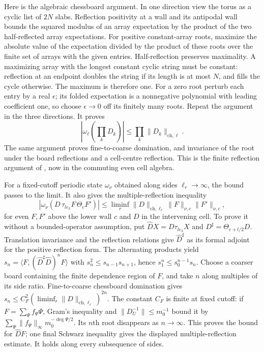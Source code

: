 \documentclass[11pt,letterpaper,reqno]{amsart}
\theoremstyle{definition}
\theoremstyle{remark}
\begin{document}
Here is the algebraic chessboard argument.  In
one direction view the torus as a cyclic list
of $2N$ slabs.  Reflection positivity at a wall
and its antipodal wall bounds the squared modulus of
an array expectation by the product of the
two half-reflected array expectations.  For
positive constant-array roots, maximize the absolute value of the
expectation divided by the product of these
roots over the finite set of arrays with the
given entries.  Half-reflection preserves
maximality.  A maximizing array with the
longest constant cyclic string must be
constant: reflection at an endpoint doubles
the string if its length is at most $N$,
and fills the cycle otherwise.  The maximum
is therefore one.  For a zero root perturb
each entry by a real $\epsilon$; its folded
expectation is a nonnegative polynomial
with leading coefficient one, so choose
$\epsilon\to0$ off its finitely many roots.
Repeat the argument in the three directions.
It proves
\[
 |\omega_\ell(\prod_kD_k)|
                 \le\prod_k\|D_k\|_{\mathrm{ch},\ell}.
\]
The same argument proves fine-to-coarse
domination, and invariance of the root under
the board reflections and a cell-centre
reflection.  This is the finite reflection
argument of \cite[Proposition 91.7]{YMM1},
now in the commuting even cell algebra.

For a fixed-cutoff periodic state $\omega_\nu$
obtained along sides $\ell_r\to\infty$, the
bound passes to the limit.  It also gives
the multiple-reflection inequality
\[
 |\omega_\nu(D\,\tau_{le_3}F\,\Theta_cF')|
 \le\liminf_r\|D\|_{\mathrm{ch},\ell_r}
                        \|F\|_{\nu,c}\|F'\|_{\nu,c},
\]
for even $F,F'$ above the lower wall $c$ and
$D$ in the intervening cell.  To prove it
without a bounded-operator assumption, put
$\widehat DX=D\tau_{le_3}X$ and
$D^\sharp=\Theta_{c+l/2}D$.
Translation invariance and the reflection
relations give $\widehat D^\sharp$ as its
formal adjoint for the positive reflection
form.  The alternating products yield
$s_n=\langle F,(\widehat D^\sharp\widehat D)^nF\rangle$
with $s_n^2\le s_{n-1}s_{n+1}$, hence
$s_1^n\le s_0^{n-1}s_n$.
Choose a coarser board containing the finite
dependence region of $F$, and take $n$ along
multiples of its side ratio.  Fine-to-coarse
chessboard domination gives
$s_n\le C_F^2(\liminf_r\|D\|_{\mathrm{ch},\ell_r})^{2n}$.
The constant $C_F$ is finite at fixed cutoff:
if $F=\sum_\Psi f_\Psi\Psi$, Gram's inequality
and $\|D_U^{-1}\|\le m_0^{-1}$ bound it by
$\sum_\Psi\|f_\Psi\|_\infty m_0^{-\deg\Psi/2}$.
Its $n$th root disappears as $n\to\infty$.
This proves the bound for $\widehat DF$;
one final Schwarz inequality gives the
displayed multiple-reflection estimate.
It holds along every subsequence of sides.
\end{document}
